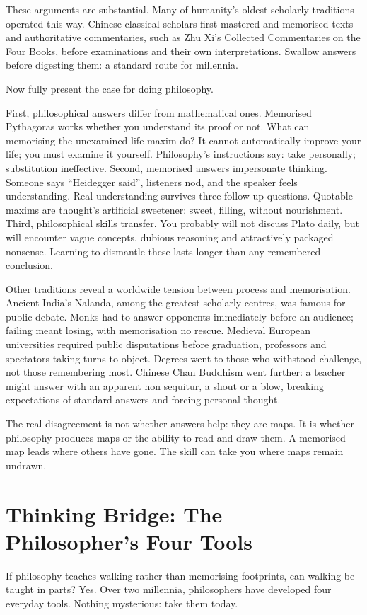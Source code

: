 These arguments are substantial. Many of humanity's oldest scholarly traditions operated this way. Chinese classical scholars first mastered and memorised texts and authoritative commentaries, such as Zhu Xi's Collected Commentaries on the Four Books, before examinations and their own interpretations. Swallow answers before digesting them: a standard route for millennia.

Now fully present the case for doing philosophy.

First, philosophical answers differ from mathematical ones. Memorised Pythagoras works whether you understand its proof or not. What can memorising the unexamined-life maxim do? It cannot automatically improve your life; you must examine it yourself. Philosophy's instructions say: take personally; substitution ineffective. Second, memorised answers impersonate thinking. Someone says ``Heidegger said'', listeners nod, and the speaker feels understanding. Real understanding survives three follow-up questions. Quotable maxims are thought's artificial sweetener: sweet, filling, without nourishment. Third, philosophical skills transfer. You probably will not discuss Plato daily, but will encounter vague concepts, dubious reasoning and attractively packaged nonsense. Learning to dismantle these lasts longer than any remembered conclusion.

Other traditions reveal a worldwide tension between process and memorisation. Ancient India's Nalanda, among the greatest scholarly centres, was famous for public debate. Monks had to answer opponents immediately before an audience; failing meant losing, with memorisation no rescue. Medieval European universities required public disputations before graduation, professors and spectators taking turns to object. Degrees went to those who withstood challenge, not those remembering most. Chinese Chan Buddhism went further: a teacher might answer with an apparent non sequitur, a shout or a blow, breaking expectations of standard answers and forcing personal thought.

The real disagreement is not whether answers help: they are maps. It is whether philosophy produces maps or the ability to read and draw them. A memorised map leads where others have gone. The skill can take you where maps remain undrawn.

\section[Thinking Bridge: Four Tools]{Thinking Bridge: The Philosopher's Four Tools}
If philosophy teaches walking rather than memorising footprints, can walking be taught in parts? Yes. Over two millennia, philosophers have developed four everyday tools. Nothing mysterious: take them today.

